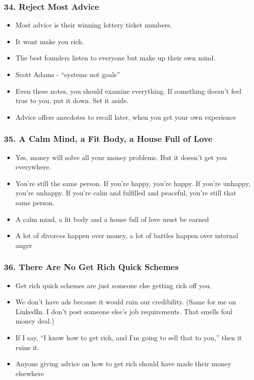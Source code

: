 \begin{frame}[fragile]
\frametitle{34. Reject Most Advice}
\begin{itemize}
\item Most advice is their winning lottery ticket numbers. 
\item It wont make you rich.
\item The best founders listen to everyone but make up their own mind.
\item Scott Adams - ``systems not goals''
\item Even these notes,  you should examine everything. If something doesn't feel true to you, put it down. Set it aside.
\item Advice offers anecdotes to recall later, when you get your own experience
\end{itemize}
\end{frame}

\begin{frame}[fragile]
\frametitle{35. A Calm Mind, a Fit Body, a House Full of Love}
\begin{itemize}
\item Yes, money will solve all your money problems. But it doesn't get you everywhere. 
\item You're still the same person.  If
you're happy, you're happy. If you're unhappy, you're unhappy. If you're calm and fulfilled and peaceful,
you're still that same person.
\item A calm mind, a  fit body and a house full of love must be earned
\item A lot of divorces happen over money, a lot of battles happen over internal anger
\end{itemize}
\end{frame}

\begin{frame}[fragile]
\frametitle{36. There Are No Get Rich Quick Schemes}
\begin{itemize}
\item Get rich quick schemes are just someone else getting rich off  you.
\item We don't have ads because it would ruin our credibility. (Same for me on LinkedIn. I don't post someone else's job requirements. That smells foul money deal.)
\item If I say, ``I know how to get rich, and I'm going to sell that to you,'' then it ruins it.
\item Anyone giving advice on how to get rich should have made their money elsewhere
\end{itemize}
\end{frame}

